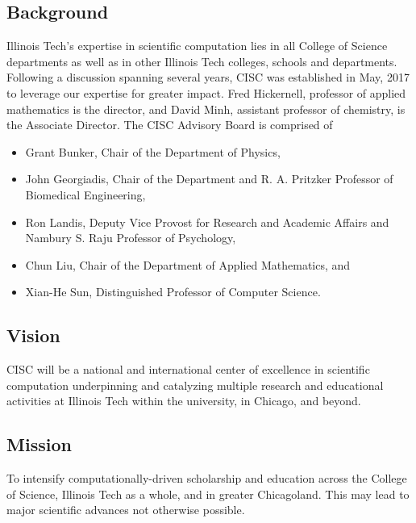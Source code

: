 \documentclass[12pt]{amsart}
\begin{document}
\subsection*{Background} Illinois Tech's expertise in scientific computation lies in all College of Science departments as well as in other Illinois Tech colleges, schools and departments.  Following a discussion spanning several years, CISC was established in May, 2017 to leverage our expertise for greater impact.  Fred Hickernell, professor of applied mathematics is the director, and David Minh, assistant professor of chemistry, is the Associate Director.  The CISC Advisory Board is comprised of 
\begin{itemize}
    \item Grant Bunker, Chair of the Department of Physics, 
    \item John Georgiadis, Chair of  the Department and R. A. Pritzker Professor of Biomedical Engineering,
    
    \item Ron Landis, Deputy Vice Provost for Research and Academic Affairs and
Nambury S. Raju Professor of Psychology,

    \item Chun Liu, Chair of the Department of Applied Mathematics, and

    \item Xian-He Sun, Distinguished Professor of Computer Science.
\end{itemize}

\subsection*{Vision}
CISC will be a national and international center of excellence in scientific computation underpinning and catalyzing multiple research and educational activities at Illinois Tech within the university, in Chicago, and beyond.

\subsection*{Mission}
To intensify computationally-driven scholarship and education across the College of Science, Illinois Tech as a whole, and in greater Chicagoland.  This may lead to major scientific advances not otherwise possible.
\end{document}

